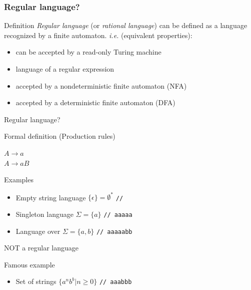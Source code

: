 \documentclass[aspectratio=169,xcolor=table]{beamer}
\newcommand\tab[1][1cm]{\hspace*{#1}}
\begin{document}
\begin{frame}
  \frametitle{Regular language?}
  \begin{block}{Definition}
    \textit{Regular language} (or \textit{rational language}) can be
    defined as a language recognized by a finite automaton.
    \textit{i.e.} (equivalent properties):
    \begin{itemize}
    \item can be accepted by a read-only Turing machine \pause
    \item language of a regular expression \pause
    \item accepted by a nondeterministic finite automaton (NFA) \pause
    \item accepted by a deterministic finite automaton (DFA)
    \end{itemize}
  \end{block}
\end{frame}


\begin{frame}{Regular language?}
  \begin{block}{Formal definition (Production rules)}
    \begin{center}
      $ A \to a $ \\
      $ A \to aB $
    \end{center}
  \end{block}
  \begin{exampleblock}{Examples}
    \begin{itemize}
    \item Empty string language $\{\epsilon\} = \emptyset^{*}$ \tab[1.3cm] \texttt{// }
    \item Singleton language $\Sigma = \{a\}$ \tab \tab \texttt{// aaaaa}
    \item Language over $\Sigma = \{a,b\}$ \tab[2.15cm] \texttt{// aaaaabb}
    \end{itemize}
  \end{exampleblock}
\end{frame}


\begin{frame}{NOT a regular language}
  \begin{block}{Famous example}
    \begin{itemize}
    \item Set of strings $\{a^{n}b^{b} | n \geq 0 \}$ \tab \texttt{// aaabbb}
    \end{itemize}
  \end{block}
\end{frame}
\end{document}
